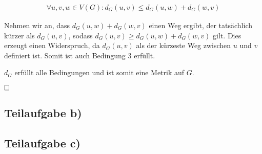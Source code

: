 \documentclass[12pt]{scrartcl}%
\theoremstyle{nonumberplain}
\begin{document}
\begin{align*}
	\forall u,v,w \in V(G): d_G(u,v) \le d_G(u,w) + d_G(w,v)
\end{align*}

Nehmen wir an, dass $d_G(u,w) + d_G(w,v)$ einen Weg ergibt, der tatsächlich kürzer als $d_G(u,v)$, sodass $d_G(u,v) \ge d_G(u,w) + d_G(w,v)$ gilt. Dies erzeugt einen Widerspruch, da $d_G(u,v)$ als der kürzeste Weg zwischen $u$ und $v$ definiert ist. Somit ist auch Bedingung 3 erfüllt.

$d_G$ erfüllt alle Bedingungen und ist somit eine Metrik auf $G$.

$\hfill \square$

\subsection*{Teilaufgabe b)}


\subsection*{Teilaufgabe c)}
\end{document}
